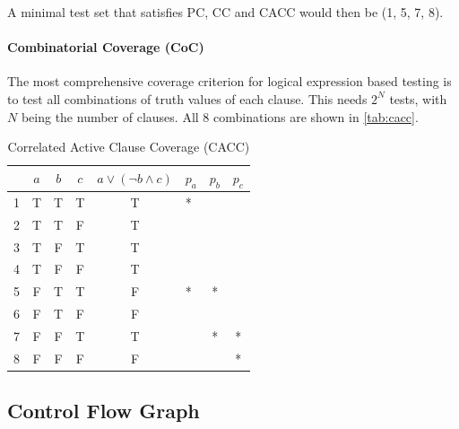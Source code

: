 \documentclass{scrreprt}
\begin{document}
A minimal test set that satisfies PC, CC and CACC would then be (1, 5, 7, 8).

\paragraph{Combinatorial Coverage (CoC)}

The most comprehensive coverage criterion for logical expression based testing is to test all combinations of truth values of each clause. This needs $2^N$ tests, with $N$ being the number of clauses. All 8 combinations are shown in \vref{tab:cacc}. 

\begin{table}[h]
	\centering
	\caption{\label{tab:cacc}Correlated Active Clause Coverage (CACC)}
	\begin{tabular}{r|ccc|c|l|c|c}
		   & $a$ & $b$ & $c$ & $a \lor (\lnot b \land c)$ & $p_a$ & $p_b$ & $p_c$ \\ \hline
		1 & T & T & T & T & *\quad\quad  &   &  \\
		2 & T & T & F & T & \quad*\quad  &   &  \\
		3 & T & F & T & T & \quad\quad*  &   &  \\
		4 & T & F & F & T &        &   &  \\
		5 & F & T & T & F & *\quad\quad  & * &  \\
		6 & F & T & F & F & \quad*\quad &   &  \\
		7 & F & F & T & T &        & * & *  \\
		8 & F & F & F & F & \quad\quad* &   & *  \\
	\end{tabular}
\end{table}

\subsection{Control Flow Graph}
\end{document}
